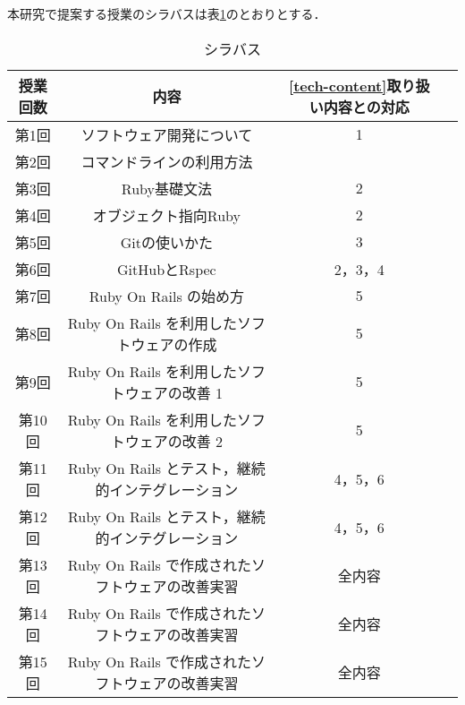 本研究で提案する授業のシラバスは表\ref{tab:シラバス}のとおりとする．

\begin{table}[ht]
    \caption{シラバス}
    \begin{tabular}{|c|c|c|c|}
      \hline
      授業回数 & 内容 & \ref{tech-content}取り扱い内容との対応 \\%
      \hline
      第1回 & ソフトウェア開発について & 1 \\%
      \hline
      第2回 & コマンドラインの利用方法 &  \\%
      \hline
      第3回 & Ruby基礎文法 &  2 \\%
      \hline
      第4回 & オブジェクト指向Ruby & 2 \\%
      \hline
      第5回 & Gitの使いかた & 3 \\%
      \hline
      第6回 & GitHubとRspec & 2，3，4 \\%
      \hline
      第7回 & Ruby On Rails の始め方 & 5 \\%
      \hline
      第8回 & Ruby On Rails を利用したソフトウェアの作成 & 5 \\%
      \hline
      第9回 & Ruby On Rails を利用したソフトウェアの改善 1 & 5 \\%
      \hline
      第10回 & Ruby On Rails を利用したソフトウェアの改善 2 & 5 \\%
      \hline
      第11回 & Ruby On Rails とテスト，継続的インテグレーション & 4，5，6 \\%
      \hline
      第12回 & Ruby On Rails とテスト，継続的インテグレーション & 4，5，6 \\%
      \hline
      第13回 & Ruby On Rails で作成されたソフトウェアの改善実習 & 全内容 \\%
      \hline
      第14回 & Ruby On Rails で作成されたソフトウェアの改善実習 & 全内容 \\%
      \hline
      第15回 & Ruby On Rails で作成されたソフトウェアの改善実習 & 全内容 \\%
      \hline
    \end{tabular}
    \label{tab:シラバス}
\end{table}


